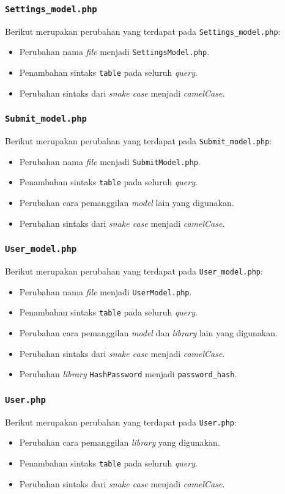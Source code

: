 \subsubsection{\texttt{Settings\_model.php}}
Berikut merupakan perubahan yang terdapat pada \texttt{Settings\_model.php}:
\begin{itemize}
	\item Perubahan nama \textit{file} menjadi \texttt{SettingsModel.php}.
	\item Penambahan sintaks \texttt{table} pada seluruh \textit{query}.
	\item Perubahan sintaks dari \textit{snake case} menjadi \textit{camelCase}.
\end{itemize}
\subsubsection{\texttt{Submit\_model.php}}
Berikut merupakan perubahan yang terdapat pada \texttt{Submit\_model.php}:
\begin{itemize}
	\item Perubahan nama \textit{file} menjadi \texttt{SubmitModel.php}.
	\item Penambahan sintaks \texttt{table} pada seluruh \textit{query}.
	\item Perubahan cara pemanggilan \textit{model} lain yang digunakan.
	\item Perubahan sintaks dari \textit{snake case} menjadi \textit{camelCase}.
\end{itemize}
\subsubsection{\texttt{User\_model.php}}
Berikut merupakan perubahan yang terdapat pada \texttt{User\_model.php}:
\begin{itemize}
	\item Perubahan nama \textit{file} menjadi \texttt{UserModel.php}.
	\item Penambahan sintaks \texttt{table} pada seluruh \textit{query}.
	\item Perubahan cara pemanggilan \textit{model} dan \textit{library} lain yang digunakan.
	\item Perubahan sintaks dari \textit{snake case} menjadi \textit{camelCase}.
	\item Perubahan \textit{library} \texttt{HashPassword} menjadi \texttt{password\_hash}.
\end{itemize}
\subsubsection{\texttt{User.php}}
Berikut merupakan perubahan yang terdapat pada \texttt{User.php}:
\begin{itemize}
	\item Perubahan cara pemanggilan \textit{library} yang digunakan.
	\item Penambahan sintaks \texttt{table} pada seluruh \textit{query}.
	\item Perubahan sintaks dari \textit{snake case} menjadi \textit{camelCase}.
\end{itemize}

